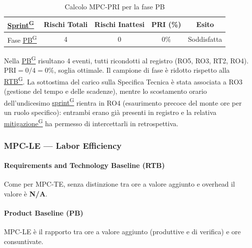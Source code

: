 \documentclass[a4paper,12pt]{article}
\providecommand{\glslink}[2]{\href{https://alittlebyte-19.github.io/Documentazione/glossario.html\#gls-#1}{\underline{#2}\textsuperscript{\scriptsize G}}}
\begin{document}
\begin{table}[H]
    \centering
    \begin{tabular}{|l|c|c|c|c|}
        \hline
        \rowcolor{gray!35}
        \textbf{\glslink{sprint}{Sprint}} & \textbf{Rischi Totali} & \textbf{Rischi Inattesi} & \textbf{PRI (\%)} & \textbf{Esito} \\
        \hline
        Fase \glslink{pb-product-baseline}{PB} & 4 & 0 & 0\% & \textcolor{green!60!black}{Soddisfatta} \\
        \hline
    \end{tabular}
    \caption{Calcolo MPC-PRI per la fase PB}
\end{table}

Nella \glslink{pb-product-baseline}{PB} risultano 4 eventi, tutti ricondotti al registro (RO5, RO3, RT2, RO4). $\text{PRI} = 0/4 = 0\%$, soglia ottimale. Il campione di fase è ridotto rispetto alla \glslink{rtb-requirements-and-technology-baseline}{RTB}. La sottostima del carico sulla Specifica Tecnica è stata associata a RO3 (gestione del tempo e delle scadenze), mentre lo scostamento orario dell'undicesimo \glslink{sprint}{sprint} rientra in RO4 (esaurimento precoce del monte ore per un ruolo specifico): entrambi erano già presenti in registro e la relativa \glslink{mitigazione-dei-rischi}{mitigazione} ha permesso di intercettarli in retrospettiva.

\subsubsection{MPC-LE — Labor Efficiency}

\paragraph*{Requirements and Technology Baseline (RTB)} Come per MPC-TE, senza distinzione tra ore a valore aggiunto e overhead il valore è \textbf{N/A}.

\paragraph*{Product Baseline (PB)} MPC-LE è il rapporto tra ore a valore aggiunto (produttive e di verifica) e ore consuntivate.
\end{document}
